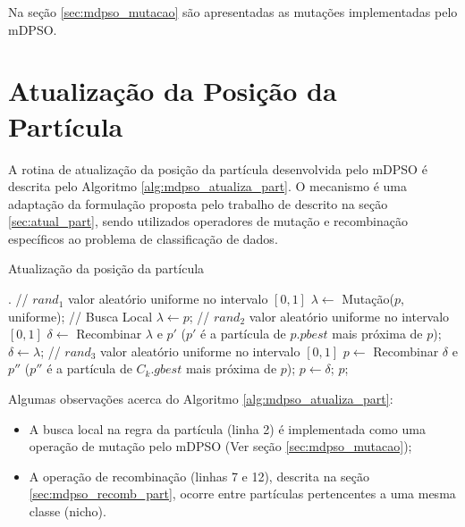 \documentclass[
	12pt,				%
	openany,			%
	oneside,	
	a4paper,			%
	brazil,				%
	]{unimontes-ppgmsc-abntex2}
\begin{document}
Na seção \ref{sec:mdpso_mutacao} são apresentadas as mutações implementadas pelo mDPSO.

\section{Atualização da Posição da Partícula}
\label{sec:mdpso_atual_pos_part}

A rotina de atualização da posição da partícula desenvolvida pelo mDPSO é descrita pelo Algoritmo \ref{alg:mdpso_atualiza_part}. O mecanismo é uma adaptação da formulação proposta pelo trabalho de  descrito na seção \ref{sec:atual_part}, sendo utilizados operadores de mutação e recombinação específicos ao problema de classificação de dados. 

\begin{algorithm}[ht]
\caption{Atualização da posição da partícula}
\label{alg:mdpso_atualiza_part}
\begin{algorithmic}[1]
.
\State // $rand_1$ valor aleatório uniforme no intervalo $[0, 1]$
	\State $\lambda \leftarrow $ Mutação($p$, uniforme); // Busca Local 
\Else
	\State $\lambda \leftarrow p$;
\EndIf
\State // $rand_2$ valor aleatório uniforme no intervalo $[0, 1]$
	\State $\delta \leftarrow $ Recombinar $\lambda$ e $p'$ ($p'$ é a partícula de $p.pbest$ mais próxima de $p$);
\Else
	\State $\delta \leftarrow \lambda$;
\EndIf
\State // $rand_3$ valor aleatório uniforme no intervalo $[0, 1]$
	\State $p \leftarrow $ Recombinar $\delta$ e $p''$ ($p''$ é a partícula de $C_k.gbest$ mais próxima de $p$);
\Else
	\State $p \leftarrow \delta$;
\EndIf
\State \Return $p$;
\end{algorithmic}
\end{algorithm}

Algumas observações acerca do Algoritmo \ref{alg:mdpso_atualiza_part}:

\begin{itemize}
\item A busca local na regra da partícula (linha 2) é implementada como uma operação de mutação pelo mDPSO (Ver seção \ref{sec:mdpso_mutacao});
\item A operação de recombinação (linhas 7 e 12), descrita na seção \ref{sec:mdpso_recomb_part}, ocorre entre partículas pertencentes a uma mesma classe (nicho).
\end{itemize}
\end{document}
